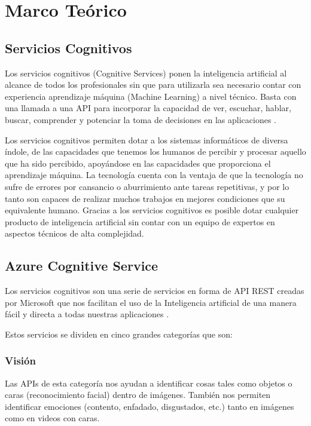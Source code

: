 \section{Marco Teórico}

\subsection{Servicios Cognitivos}

Los servicios cognitivos (Cognitive Services) ponen la inteligencia artificial al alcance de todos los profesionales sin que para utilizarla sea necesario contar con experiencia aprendizaje máquina (Machine Learning) a nivel técnico. Basta con una llamada a una API para incorporar la capacidad de ver, escuchar, hablar, buscar, comprender y potenciar la toma de decisiones en las aplicaciones \cite{Shwartz2019}.

Los servicios cognitivos permiten dotar a los sistemas informáticos de diversa índole, de las capacidades que tenemos los humanos de percibir y procesar aquello que ha sido percibido, apoyándose en las capacidades que proporciona el aprendizaje máquina. La tecnología cuenta con la ventaja de que la tecnología no sufre de errores por cansancio o aburrimiento ante tareas repetitivas, y por lo tanto son capaces de realizar muchos trabajos en mejores condiciones que su equivalente humano. Gracias a los servicios cognitivos es posible dotar cualquier producto de inteligencia artificial sin contar con un equipo de expertos en aspectos técnicos de alta complejidad.

\subsection{Azure Cognitive Service}

Los servicios cognitivos son una serie de servicios en forma de API REST creadas por Microsoft que nos facilitan el uso de la Inteligencia artificial de una manera fácil y directa a todas nuestras aplicaciones \cite{Brusakova2020}.

Estos servicios se dividen en cinco grandes categorías que son:

\subsubsection{Visión} Las APIs de esta categoría nos ayudan a identificar cosas tales como objetos o caras (reconocimiento facial) dentro de imágenes. También nos permiten identificar emociones (contento, enfadado, disgustados, etc.) tanto en imágenes como en videos con caras.

